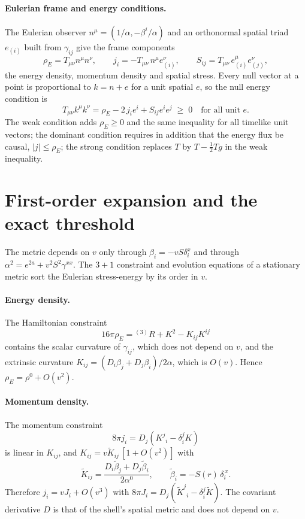\documentclass[11pt,a4paper]{article}
\theoremstyle{remark}
\newcommand{\Ks}{\tilde K}
\newcommand{\bs}{\tilde\beta}
\begin{document}
\paragraph{Eulerian frame and energy conditions.} The Eulerian observer $n^\mu = (1/\alpha, -\beta^i/\alpha)$ and an orthonormal spatial triad $e_{(i)}$ built from $\gamma_{ij}$ give the frame components
\begin{equation}
\rho_E = T_{\mu\nu}n^\mu n^\nu, \qquad j_i = -T_{\mu\nu}\,n^\mu e_{(i)}^\nu, \qquad S_{ij} = T_{\mu\nu}\,e_{(i)}^\mu e_{(j)}^\nu ,
\end{equation}
the energy density, momentum density and spatial stress. Every null vector at a point is proportional to $k = n + e$ for a unit spatial $e$, so the null energy condition is
\begin{equation}
T_{\mu\nu}k^\mu k^\nu = \rho_E - 2\,j_i e^i + S_{ij}e^i e^j \;\ge\; 0 \quad \text{for all unit } e .
\label{eq:nec}
\end{equation}
The weak condition adds $\rho_E \ge 0$ and the same inequality for all timelike unit vectors; the dominant condition requires in addition that the energy flux be causal, $|j| \le \rho_E$; the strong condition replaces $T$ by $T - \tfrac12 T g$ in the weak inequality.

\section{First-order expansion and the exact threshold}\label{sec:first}

The metric depends on $v$ only through $\beta_i = -vS\delta_i^x$ and through $\alpha^2 = e^{2a} + v^2S^2\gamma^{xx}$. The $3+1$ constraint and evolution equations of a stationary metric \cite{Baumgarte} sort the Eulerian stress-energy by its order in $v$.

\paragraph{Energy density.} The Hamiltonian constraint
\begin{equation}
16\pi\rho_E = {}^{(3)}\!R + K^2 - K_{ij}K^{ij}
\end{equation}
contains the scalar curvature of $\gamma_{ij}$, which does not depend on $v$, and the extrinsic curvature $K_{ij} = (D_i\beta_j + D_j\beta_i)/2\alpha$, which is $O(v)$. Hence $\rho_E = \rho^0 + O(v^2)$.

\paragraph{Momentum density.} The momentum constraint
\begin{equation}
8\pi j_i = D_j\!\left(K^j{}_i - \delta^j_i K\right)
\label{eq:mom}
\end{equation}
is linear in $K_{ij}$, and $K_{ij} = v\Ks_{ij}\,[1 + O(v^2)]$ with
\begin{equation}
\Ks_{ij} = \frac{D_i\bs_j + D_j\bs_i}{2\alpha^0}, \qquad \bs_i = -S(r)\,\delta_i^{\,x} .
\end{equation}
Therefore $j_i = v J_i + O(v^3)$ with $8\pi J_i = D_j(\Ks^j{}_i - \delta^j_i\Ks)$. The covariant derivative $D$ is that of the shell's spatial metric and does not depend on $v$.
\end{document}
